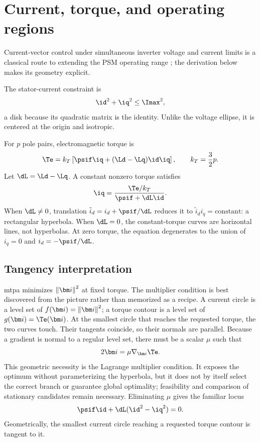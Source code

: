 \section{Current, torque, and operating regions}

Current-vector control under simultaneous inverter voltage and current limits
is a classical route to extending the PSM operating range
\cite{morimoto1990,kim1997}; the derivation below makes its geometry explicit.

The stator-current constraint is
\begin{equation}
 \id^2+\iq^2\leq\Imax^2,\label{eq:current-circle}
\end{equation}
a disk because its quadratic matrix is the identity.  Unlike the voltage
ellipse, it is centered at the origin and isotropic.

For $p$ pole pairs, electromagnetic torque is
\begin{equation}
 \Te=\kt\left[\psif\iq+(\Ld-\Lq)\id\iq\right],
 \qquad \kt=\frac32p.\label{eq:psm-torque}
\end{equation}
Let $\dL=\Ld-\Lq$.  A constant nonzero torque satisfies
\begin{equation}
 \iq=\frac{\Te/\kt}{\psif+\dL\id}.\label{eq:torque-hyperbola}
\end{equation}
When $\dL\neq0$, translation $\tilde i_d=i_d+\psif/\dL$ reduces it to
$\tilde i_d i_q=\text{constant}$: a rectangular hyperbola.  When $\dL=0$,
the constant-torque curves are horizontal lines, not hyperbolas.  At zero
torque, the equation degenerates to the union of $i_q=0$ and
$i_d=-\psif/\dL$.




\subsection{Tangency interpretation}

\gls{mtpa} minimizes $\norm{\current}^2$ at fixed torque.  The multiplier
condition is best discovered from the picture rather than memorized as a
recipe.  A current circle is a level set of
$f(\current)=\norm{\current}^2$; a torque contour is a level set of
$g(\current)=\Te(\current)$.  At the smallest circle that reaches the requested
torque, the two curves touch.  Their tangents coincide, so their normals are
parallel.  Because a gradient is normal to a regular level set, there must be
a scalar $\mu$ such that
\begin{equation}
 2\current=\mu\nabla_{\current}\Te.
\end{equation}
This geometric necessity is the Lagrange multiplier condition.  It exposes
the optimum without parameterizing the hyperbola, but it does not by itself
select the correct branch or guarantee global optimality; feasibility and
comparison of stationary candidates remain necessary.
Eliminating $\mu$ gives the familiar locus
\begin{equation}
 \psif\id+\dL(\id^2-\iq^2)=0.\label{eq:mtpa-locus}
\end{equation}
Geometrically, the smallest current circle reaching a requested torque contour
is tangent to it.

